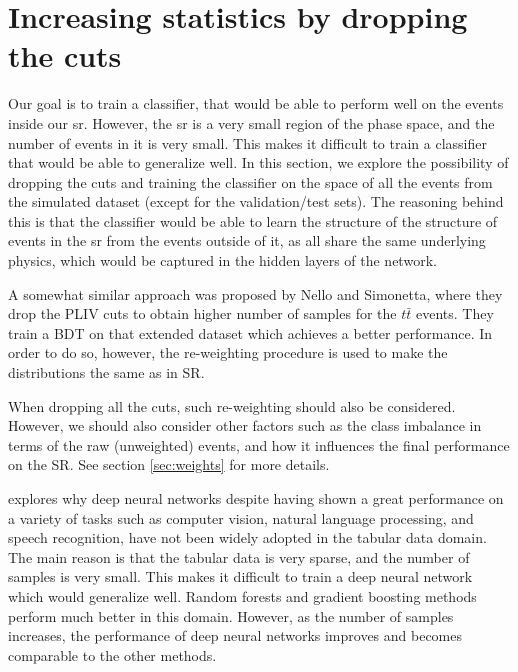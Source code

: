 \section{Increasing statistics by dropping the cuts}
\label{sec:extended-set}

Our goal is to train a classifier, that would be able to perform well on the events inside our \gls{sr}. However, the
\gls{sr} is a very small region of the phase space, and the number of events in it is very small. This makes it
difficult to train a classifier that would be able to generalize well. In this section, we explore the possibility of
dropping the cuts and training the classifier on the space of all the events from the simulated dataset (except for the
validation/test sets). The reasoning behind this is that the classifier would be able to learn the structure of the
structure of events in the \gls{sr} from the events outside of it, as all share the same underlying physics, which would
be captured in the hidden layers of the network.

A somewhat similar approach was proposed by Nello and Simonetta, where they drop the PLIV cuts to obtain higher number
of samples for the $t\bar{t}$ events. They train a BDT on that extended dataset which achieves a better performance. In
order to do so, however, the re-weighting procedure is used to make the distributions the same as in SR.

When dropping all the cuts, such re-weighting should also be considered. However, we should also consider other factors
such as the class imbalance in terms of the raw (unweighted) events, and how it influences the final performance on the
SR. See section \ref{sec:weights} for more details.

\cite{tabular} explores why deep neural networks despite having shown a great performance on a variety of tasks such as
computer vision, natural language processing, and speech recognition, have not been widely adopted in the tabular data
domain. The main reason is that the tabular data is very sparse, and the number of samples is very small. This makes it
difficult to train a deep neural network which would generalize well. Random forests and gradient boosting methods
perform much better in this domain. However, as the number of samples increases, the performance of deep neural networks
improves and becomes comparable to the other methods.


